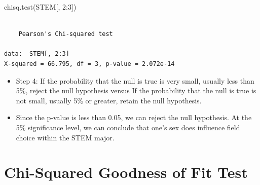 \documentclass[
  letterpaper,
  DIV=11,
  numbers=noendperiod]{scrreprt}
\newenvironment{Shaded}{\begin{snugshade}}{\end{snugshade}}
\newcommand{\DecValTok}[1]{\textcolor[rgb]{0.68,0.00,0.00}{#1}}
\newcommand{\FunctionTok}[1]{\textcolor[rgb]{0.28,0.35,0.67}{#1}}
\newcommand{\NormalTok}[1]{\textcolor[rgb]{0.00,0.23,0.31}{#1}}
\newcommand{\SpecialCharTok}[1]{\textcolor[rgb]{0.37,0.37,0.37}{#1}}
\providecommand{\tightlist}{%
  \setlength{\itemsep}{0pt}\setlength{\parskip}{0pt}}\usepackage{longtable,booktabs,array}
\begin{document}
\begin{Shaded}
\begin{Highlighting}[]
\FunctionTok{chisq.test}\NormalTok{(STEM[, }\DecValTok{2}\SpecialCharTok{:}\DecValTok{3}\NormalTok{])}
\end{Highlighting}
\end{Shaded}

\begin{verbatim}

    Pearson's Chi-squared test

data:  STEM[, 2:3]
X-squared = 66.795, df = 3, p-value = 2.072e-14
\end{verbatim}

\begin{itemize}
\tightlist
\item
  Step 4: If the probability that the null is true is very small,
  usually less than 5\%, reject the null hypothesis versus If the
  probability that the null is true is not small, usually 5\% or
  greater, retain the null hypothesis.
\item
  Since the p-value is less than 0.05, we can reject the null
  hypothesis. At the 5\% significance level, we can conclude that one's
  sex does influence field choice within the STEM major.
\end{itemize}


\chapter{Chi-Squared Goodness of Fit
Test}\label{chi-squared-goodness-of-fit-test}
\end{document}
